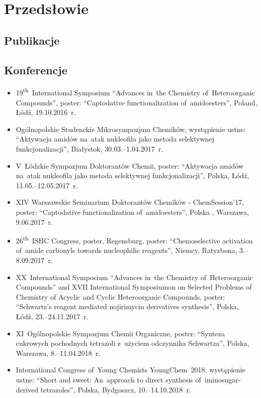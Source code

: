 \chapter{Przedsłowie}

\section{Publikacje}

\section{Konferencje}
\begin{fullwidth}
\begin{itemize}
  \item 19\textsuperscript{th}~International Symposium \enquote{Advances in~the Chemistry of~Heteroorganic Compounds}, poster: \enquote{Captodative functionalization of~amidoesters}, Poland, Łódź, 19.10.2016~r.
  \item Ogólnopolskie Studenckie Mikrosympozjum Chemików, wystąpienie ustne: \enquote{Aktywacja amidów na~atak nukleofila jako metoda selektywnej funkcjonalizacji}, Białystok, 30.03.\-–1.04.2017~r.
  \item V~Łódzkie Sympozjum Doktorantów Chemii, poster: \enquote{Aktywacja amidów na~atak nukleofila jako metoda selektywnej funkcjonalizacji}, Polska, Łódź, 11.05.\-–12.05.2017~r.
  \item XIV Warszawskie Seminarium Doktorantów Chemików - ChemSession’17, poster: \enquote{Captodative functionalization of~amidoesters}, Polska , Warszawa, 9.06.2017~r.
  \item 26\textsuperscript{th}~ISHC Congress, poster, Regensburg, poster: \enquote{Chemoselective activation of~amide carbonyls towards nucleophilic reagents}, Niemcy, Ratyzbona, 3.\-–8.09.2017~r.
  \item XX~International Symposium \enquote{Advances in~the Chemistry of~Heteroorganic Compounds} and XVII International Symposiumon on Selected Problems of Chemistry of Acyclic and Cyclic Heteroorganic Compounds, poster: \enquote{Schwartz’s reagent mediated nojirimycin derivatives synthesis}, Polska, Łódź, 23.\-–24.11.2017~r.
  \item XI~Ogólnopolskie Sympozjum Chemii Organiczne, poster: \enquote{Synteza cukrowych pochodnych tetrazoli z~użyciem odczynnika Schwartza}, Polska, Warszawa, 8.\-–11.04.2018~r.
  \item International Congress of~Young Chemists YoungChem~2018, wystąpienie ustne: \enquote{Short and sweet: An~approach to direct synthesis of~iminosugar-derived tetrazoles}, Polska, Bydgoszcz, 10.\-–14.10.2018~r.

\end{itemize}
\end{fullwidth}
